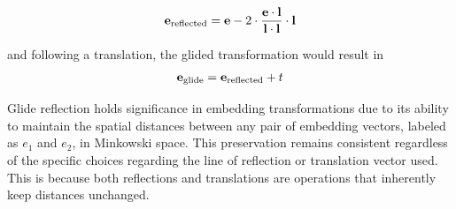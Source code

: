 \documentclass[letterpaper]{article} %
\begin{document}
\begin{equation}
\mathbf{e}_{\text{reflected}} = \mathbf{e} - 2 \cdot \frac{\mathbf{e} \cdot \mathbf{l}}{\mathbf{l} \cdot \mathbf{l}} \cdot \mathbf{l} \\
\label{eq:reflection}
\end{equation}

and following a translation, the glided transformation would result in
\begin{equation}
\mathbf{e}_{\text{glide}} = \mathbf{e}_{\text{reflected}} + t\\
\label{eq:glide}
\end{equation}

Glide reflection holds significance in embedding transformations due to its ability to maintain the spatial distances between any pair of embedding vectors, labeled as $e_1$ and $e_2$, in Minkowski space. This preservation remains consistent regardless of the specific choices regarding the line of reflection or translation vector used. This is because both reflections and translations are operations that inherently keep distances unchanged.
\end{document}
